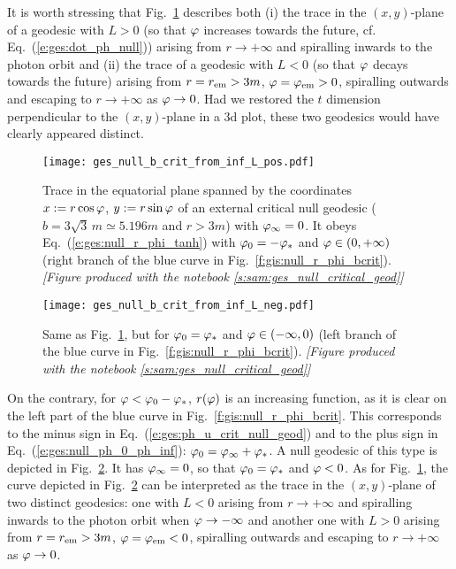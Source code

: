 It is worth stressing that Fig.~\ref{f:gis:null_b_crit_from_inf_L_pos} describes both (i) the trace
in the $(x,y)$-plane of a
geodesic with $L>0$ (so that $\varphi$ increases towards the future, cf. Eq.~(\ref{e:ges:dot_ph_null})) arising from $r\to + \infty$
and spiralling inwards to the photon orbit
and (ii) the trace of a geodesic with $L<0$ (so that $\varphi$ decays towards the future)
arising from $r=r_{\rm em} > 3 m$, $\varphi=\varphi_{\rm em}>0$,
spiralling outwards and escaping to $r\to +\infty$ as $\varphi\to 0$. Had we restored the
$t$ dimension perpendicular to the $(x,y)$-plane in a 3d plot, these two geodesics would have
clearly appeared distinct.

\begin{figure}
\centerline{\texttt{[image: ges\_null\_b\_crit\_from\_inf\_L\_pos.pdf]}}
\caption[]{\label{f:gis:null_b_crit_from_inf_L_pos} \footnotesize
Trace in the equatorial plane spanned by the coordinates $x:=r\cos\varphi$, $y:=r\sin\varphi$
of an external critical null geodesic ($b = 3\sqrt{3} \, m \simeq 5.196 m$ and
$r>3m$) with $\varphi_\infty=0$.
It obeys Eq.~(\ref{e:ges:null_r_phi_tanh}) with $\varphi_0 = -\varphi_*$ and $\varphi\in(0,+\infty)$
(right branch of the blue curve in Fig.~\ref{f:gis:null_r_phi_bcrit}).
\textsl{[Figure produced with the notebook \ref{s:sam:ges_null_critical_geod}]}
}
\end{figure}

\begin{figure}
\centerline{\texttt{[image: ges\_null\_b\_crit\_from\_inf\_L\_neg.pdf]}}
\caption[]{\label{f:gis:null_b_crit_from_inf_L_neg} \footnotesize
Same as Fig.~\ref{f:gis:null_b_crit_from_inf_L_pos}, but for $\varphi_0 = \varphi_*$
and $\varphi\in(-\infty,0)$ (left branch of the blue curve in Fig.~\ref{f:gis:null_r_phi_bcrit}).
\textsl{[Figure produced with the notebook \ref{s:sam:ges_null_critical_geod}]}
}
\end{figure}

On the contrary, for $\varphi < \varphi_0 - \varphi_*$,
$r(\varphi)$ is an increasing
function, as it is clear on the left part of the blue curve in Fig.~\ref{f:gis:null_r_phi_bcrit}.
This corresponds to the
minus sign in Eq.~(\ref{e:ges:ph_u_crit_null_geod}) and to the plus sign in
Eq.~(\ref{e:ges:null_ph_0_ph_inf}): $\varphi_0 = \varphi_\infty + \varphi_*$.
A null geodesic of this type is depicted in Fig.~\ref{f:gis:null_b_crit_from_inf_L_neg}.
It has $\varphi_\infty = 0$, so that $\varphi_0 = \varphi_*$ and $\varphi < 0$.
As for Fig.~\ref{f:gis:null_b_crit_from_inf_L_pos}, the curve depicted in
Fig.~\ref{f:gis:null_b_crit_from_inf_L_neg} can be interpreted as the trace
in the $(x,y)$-plane of two distinct
geodesics: one with $L<0$ arising from $r\to + \infty$
and spiralling inwards to the photon orbit when $\varphi\to -\infty$
and another one with $L>0$
arising from $r=r_{\rm em} > 3 m$, $\varphi=\varphi_{\rm em}<0$,
spiralling outwards and escaping to $r\to +\infty$ as $\varphi\to 0$.

